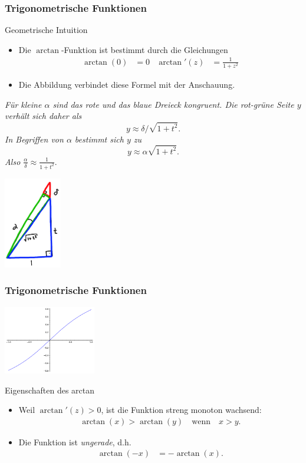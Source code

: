 \documentclass{beamer}
\renewcommand{\emph}[1]{{\textcolor{solarizedRed}{\itshape #1}}}
\renewcommand{\ae}{\"a}
\newcommand{\ue}{\"u}
\newcommand{\mytitle}{Trigonometrische Funktionen}
\begin{document}
\begin{frame}\frametitle{\mytitle}
	\begin{block}{Geometrische Intuition}
		\begin{itemize}
			\item Die $\arctan$-Funktion ist bestimmt durch die Gleichungen
				\begin{align*}
					\arctan(0)&=0&\arctan'(z)&=\frac{1}{1+z^2}
				\end{align*}
			\item Die Abbildung verbindet diese Formel mit der Anschauung.
		\end{itemize}
		\parbox[b]{70mm}{\itshape F\ue r kleine $\alpha$ sind das rote und das blaue Dreieck kongruent. Die rot-gr\ue ne Seite $y$ verh\ae lt sich daher als $$y\approx\delta/\sqrt{1+t^2}.$$ In Begriffen von $\alpha$ bestimmt sich $y$ zu $$y\approx\alpha\sqrt{1+t^2}.$$ Also $\frac{\alpha}{\delta}\approx\frac{1}{1+t^2}.$}\hfill\includegraphics[height=40mm]{pics/atan.pdf}
	\end{block}
\end{frame}

\begin{frame}\frametitle{\mytitle}
	\hfill\includegraphics[height=30mm]{pics/plot_atan.pdf}
	\begin{block}{Eigenschaften des arctan}
		\begin{itemize}
			\item Weil $\arctan'(z)>0$, ist die Funktion streng monoton wachsend:
				\begin{align*}
					\arctan(x)>\arctan(y)\quad\mbox{wenn}\quad x>y.
				\end{align*}
			\item Die Funktion ist \emph{ungerade}, d.h.
				\begin{align*}
					\arctan(-x)&=-\arctan(x).
				\end{align*}
		\end{itemize}
	\end{block}
\end{frame}
\end{document}

